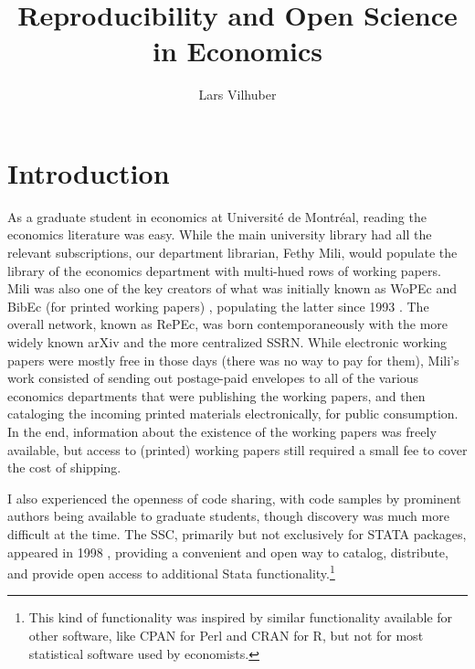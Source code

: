 \documentclass{article}
\author[1]{Lars Vilhuber}
\affil[1]{Cornell University}
\title{Reproducibility and Open Science in Economics}
\begin{document}
\maketitle

\section{Introduction}


As a graduate student in economics at Université de Montréal, reading the economics literature was  easy. While the main university library had all the relevant subscriptions, our department librarian, Fethy Mili, would populate the library of the economics department with multi-hued rows of working papers. Mili was also one of the key creators of what was initially known as \ac{WoPEc} and BibEc (for printed working papers) \citep{krichel_wopec_1997,cruz_cataloging_2000,krichel_economics_2009}, populating the latter since 1993 \citep[][p. 450]{batizlazo_brief_2012}. The overall network, known as \ac{RePEc}, was born contemporaneously with the more widely known arXiv and the more centralized \ac{SSRN}. While electronic working papers were mostly free in those days (there was no way to pay for them), Mili's work consisted of sending out postage-paid envelopes to all of the various economics departments that were publishing the working papers, and then cataloging the incoming printed materials electronically, for public consumption. In the end, information about the existence of the working papers was freely available, but access to (printed) working papers still required a small fee to cover the cost of shipping.

I also experienced the openness of code sharing, with code samples by prominent authors being available to graduate students, though discovery was much more difficult at the time.  The \ac{SSC}, primarily but not exclusively for STATA packages, appeared in 1998 \citep{cox_conversation_2010,cox_stata_2022}, providing a convenient and open way to catalog, distribute, and provide open access to additional Stata functionality.\footnote{This kind of functionality was inspired by similar functionality  available for other software, like CPAN for Perl and CRAN for R, but not for most statistical software used by economists.}
\end{document}
